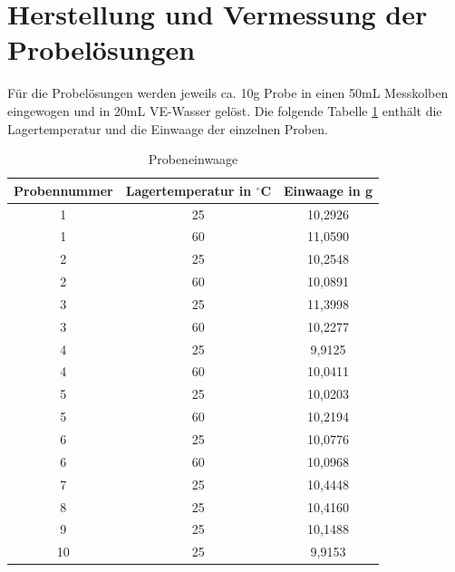 \section{Herstellung und Vermessung der Probelösungen}

Für die Probelösungen werden jeweils ca. 10g Probe in einen 50mL Messkolben eingewogen und in 20mL VE-Wasser gelöst. Die folgende Tabelle \ref{tab:Probeneinwaage} enthält die Lagertemperatur und die Einwaage der einzelnen Proben. 

\begin{table}[htbp]
	\centering
	\caption{Probeneinwaage}
		\begin{tabular}{c|c|c} 
			Probennummer & Lagertemperatur in $^\circ$C & Einwaage in g\\
			\hline
			1 & 25 & 10,2926\\
			\hline
			1 & 60 & 11,0590\\
			\hline
			2 & 25 & 10,2548\\
			\hline
			2 & 60 & 10,0891\\
			\hline
			3 & 25 & 11,3998\\
			\hline
			3 & 60 & 10,2277\\
			\hline
			4 & 25 & 9,9125\\
			\hline
			4 & 60 & 10,0411\\
			\hline
			5 & 25 & 10,0203\\
			\hline
			5 & 60 & 10,2194\\
			\hline
			6 & 25 & 10,0776\\
			\hline
			6 & 60 & 10,0968\\
			\hline
			7 & 25 & 10,4448\\
			\hline
			8 & 25 & 10,4160\\
			\hline
			9 & 25 & 10,1488\\
			\hline
			10 & 25 & 9,9153\\
		\end{tabular}
	\label{tab:Probeneinwaage}
\end{table}

